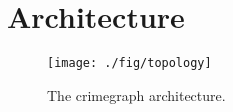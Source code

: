 \section{Architecture}
\label{sec:architecture}

\lipsum[1]

\begin{figure*}
\centering
\texttt{[image: ./fig/topology]}
\caption{The crimegraph architecture.}
\end{figure*}

\lipsum[1]
